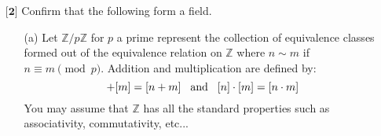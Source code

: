 \documentclass[12pt]{article}
\begin{document}
\begin{itemize}
\begin{itemize}
\begin{proof}
        Associativity: Let $\overline{w}, \overline{v}, \text{ and } \overline{z}$ be arbitrary strings from Free$(\mathcal{S})$, we can see,
        \[\overline{w} + (\overline{v} + \overline{z}) = \overline{w} + \overline{vz} = \overline{wvz} = \overline{wv} + \overline{z} = (\overline{w} + \overline{v}) + \overline{z}\]
    
        Inverses: Let $\overline{w}$ be a string from Free$(\mathcal{S})$. The inverse of $\overline{w}$ will simply be the inverse of each character $(a \to a^{-1})$ in reverse order. 
    
        $\overline{w}$ is composed of characters, we can write it out as \[\overline{w} = w_0 w_1 \dots w_n.\] Meaning the inverse of $\overline{w}$ will be of the form \[w_n^{-1}w_{n-1}^{-1}\dots w_0^{-1}.\] Thus,
        \begin{align*}
            \overline{w} + \overline{w}^{-1}  &= w_0 w_1 \dots w_n + w_n^{-1}w_{n-1}^{-1}\dots w_0^{-1} \\
            &= w_0 w_1 \dots w_n w_n^{-1}w_{n-1}^{-1}\dots w_0^{-1} \\
            &= w_0 w_1 \dots w_{n-1}w_{n-1}^{-1}\dots w_0^{-1} \\ 
            &\vdots \\
            &= w_0 w_0^{-1} \\
            &= e
        \end{align*}
    
        We know this inverse exists since Free$(\mathcal{S})$ is the collection of all finite strings from $\mathcal{S}$
    \end{proof}
    
    \end{itemize}
    
    \vspace{.5cm}
    
    \item[$\textbf{[2]}$]%
    Confirm that the following form a field.
    \begin{itemize}
    
    \vspace{.3cm}
    \item[(a)]
    Let $\mathbb{Z}/p\mathbb{Z}$ for $p$ a prime represent the collection of equivalence classes formed out of the equivalence relation on $\mathbb{Z}$ where $n \sim m$ if $n \equiv m \pmod{p}$. Addition and multiplication are defined by:
    \begin{equation*}
    [n] + [m] = [n + m] \hspace{.3cm} \text{and} \hspace{.3cm} [n] \cdot [m] = [n \cdot m]
    \end{equation*}
    You may assume that $\mathbb{Z}$ has all the standard properties such as associativity, commutativity, etc...


\end{itemize}
\end{itemize}
\end{document}

